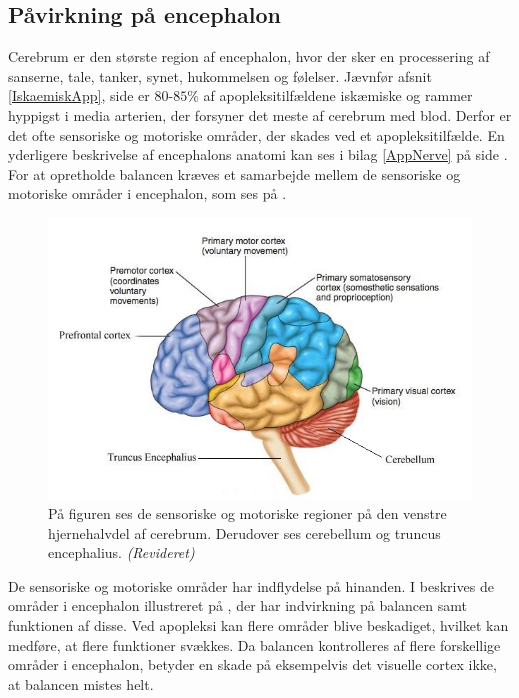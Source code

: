 \subsection{Påvirkning på encephalon}\label{HjerneSenMot}
Cerebrum er den største region af encephalon, hvor der sker en processering af sanserne, tale, tanker, synet, hukommelsen og følelser. \cite{Martini2012} Jævnfør afsnit \ref{IskaemiskApp}, side \pageref{IskaemiskApp} er $80$-$85\%$ af apopleksitilfældene iskæmiske og rammer hyppigst i media arterien, der forsyner det meste af cerebrum med blod. Derfor er det ofte sensoriske og motoriske områder, der skades ved et apopleksitilfælde. \cite{Sundhed.dk2014,Kruuse2015a,Gade2004,Boss2010} En yderligere beskrivelse af encephalons anatomi kan ses i bilag \ref{AppNerve} på side \pageref{AppNerve}. For at opretholde balancen kræves et samarbejde mellem de sensoriske og motoriske områder i encephalon, som ses på .

\begin{figure}[H]
	\centering
	\includegraphics[scale=0.8]{figures/bProblemanalyse/Encephalon3.jpg}
	\caption{På figuren ses de sensoriske og motoriske regioner på den venstre hjernehalvdel af cerebrum. Derudover ses cerebellum og truncus encephalius. \textit{(Revideret)} \cite{Stanfield2014}}
	\label{Enc}
\end{figure}

\noindent De sensoriske og motoriske områder har indflydelse på hinanden. I  beskrives de områder i encephalon illustreret på , der har indvirkning på balancen samt funktionen af disse. Ved apopleksi kan flere områder blive beskadiget, hvilket kan medføre, at flere funktioner svækkes. Da balancen kontrolleres af flere forskellige områder i encephalon, betyder en skade på eksempelvis det visuelle cortex ikke, at balancen mistes helt. 

